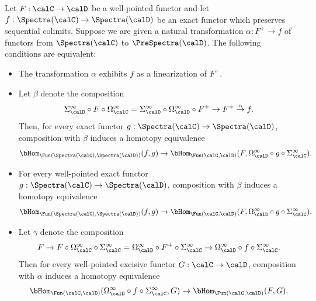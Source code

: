 \begin{theorem}\label{spiller}
Let $F: \calC \rightarrow \calD$ be a well-pointed functor and let $f: \Spectra(\calC) \rightarrow \Spectra(\calD)$ be an exact functor which preserves sequential colimits.
Suppose we are given a natural transformation $\alpha: F^{+} \rightarrow f$ of functors from
$\Spectra(\calC)$ to $\PreSpectra(\calD)$. The following conditions are equivalent:
\begin{itemize}
\item[$(1)$] The transformation $\alpha$ exhibits $f$ as a linearization of $F^{+}$.
\item[$(2)$] Let $\beta$ denote the composition
$$ \Sigma^{\infty}_{\calD} \circ F \circ \Omega^{\infty}_{\calC}
= \Sigma^{\infty}_{\calD} \circ \Omega^{\infty}_{\calD} \circ F^{+}
\rightarrow F^{+} \stackrel{\alpha}{\rightarrow} f.$$
Then, for every exact functor $g: \Spectra(\calC) \rightarrow \Spectra(\calD)$, 
composition with $\beta$ induces a homotopy equivalence
$$\bHom_{ \Fun( \Spectra(\calC), \Spectra(\calD) )}( f, g) \rightarrow
\bHom_{ \Fun( \calC, \calD)}( F, \Omega^{\infty}_{\calD} \circ g \circ \Sigma^{\infty}_{\calC}).$$

\item[$(3)$] For every well-pointed exact functor $g: \Spectra(\calC) \rightarrow \Spectra(\calD)$, composition with $\beta$ induces a homotopy equivalence
$$\bHom_{ \Fun( \Spectra(\calC), \Spectra(\calD) )}( f, g) \rightarrow
\bHom_{ \Fun( \calC, \calD)}( F, \Omega^{\infty}_{\calD} \circ g \circ \Sigma^{\infty}_{\calC}).$$

\item[$(4)$] Let $\gamma$ denote the composition
$$ F \rightarrow F \circ \Omega^{\infty}_{\calC} \circ \Sigma^{\infty}_{\calC}
 = \Omega^{\infty}_{\calD} \circ F^{+} \circ \Sigma^{\infty}_{\calC}
 \rightarrow \Omega^{\infty}_{\calD} \circ f \circ \Sigma^{\infty}_{\calC}.$$
Then for every well-pointed excisive functor $G: \calC \rightarrow \calD$, composition with $\alpha$ induces a homotopy
equivalence 
$$ \bHom_{ \Fun( \calC, \calD)}( \Omega^{\infty}_{\calD} \circ f \circ \Sigma^{\infty}_{\calC}, G) \rightarrow \bHom_{ \Fun( \calC, \calD)}( F,G).$$
\end{itemize}
\end{theorem}

